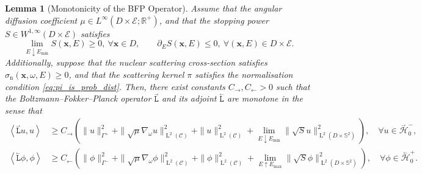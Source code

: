 \documentclass{amsart}
\newcommand{\fL}{\stackrel{_\rightarrow}{\mathtt L}}
\newcommand{\bL}{\stackrel{_\leftarrow}{\mathtt L}}
\theoremstyle{plain}
\newtheorem{lemma}[theorem]{Lemma}
\renewcommand{\vec}[1]{\ensuremath{\boldsymbol{#1}}}
\newcommand{\leb}{\text{Leb}}
\newcommand{\LL}{\ensuremath{\operatorname L}\xspace}
\renewcommand{\leb}[1]{\ensuremath{\LL^{#1}}}
\newcommand{\ltwop}[2]{\ensuremath{\!\left\langle{#1,#2}\right\rangle}}
\newcommand{\cH}{\stackrel{_\rightarrow}{\mathscr H}}
\newcommand{\cbH}{\stackrel{_\leftarrow}{\mathscr H}}
\begin{document}
\begin{lemma}[Monotonicity of the BFP Operator]
  \label{lemma:monotone}
  Assume that the angular diffusion coefficient $\mu \in
  L^{\infty}(D \times \mathcal{E}; \mathbb{R}^+)$, and that the
  stopping power $S \in W^{1,\infty}(D \times \mathcal{E})$
  satisfies
  \begin{equation}
    \lim_{E \downarrow E_{\min}} S(\vec x, E) \geq 0,~ \forall \vec x \in D, 
    \qquad 
    \partial_E S(\vec x, E) \leq 0,~ \forall (\vec x, E) \in D \times \mathcal{E}.
  \end{equation}
  Additionally, suppose that the nuclear scattering cross-section satisfies
  $\sigma_{\mathrm{n}}(\vec{x}, \omega, E) \geq 0$, and that the scattering kernel
  $\pi$ satisfies the normalisation condition \eqref{eq:pi_is_prob_dist}.
  Then, there exist constants $C_{\rightarrow}, C_{\leftarrow} > 0$ such that the
  Boltzmann--Fokker--Planck operator $\fL$ and its adjoint $\bL$ are
  monotone in the sense that
  \begin{equation}
    \begin{aligned}
        \ltwop{\fL u}{u} 
        &\geq
        C_{\rightarrow} \left(\|u\|^2_{\Gamma^+} 
        + \|\sqrt{\mu}\nabla_{\omega}u\|^2_{\leb2(\mathcal{C})} 
        + \|u\|^2_{\leb2(\mathcal{C})} 
        + \lim_{E \downarrow E_{\min}} \|\sqrt{S}u\|^2_{\leb2(D\times \mathbb{S}^2)} \right),
        \quad \forall u \in \cH_0^-, 
    \\ 
        \ltwop{\bL \phi}{\phi} 
        &\geq 
        C_{\leftarrow} \left(\|\phi\|^2_{\Gamma^-} 
        + \|\sqrt{\mu}\nabla_{\omega}\phi\|^2_{\leb2(\mathcal{C})} 
        + \|\phi\|^2_{\leb2(\mathcal{C})} 
        + \lim_{E \uparrow E_{\max}} \|\sqrt{S}\phi\|^2_{\leb2(D\times \mathbb{S}^2)} \right), 
        \quad \forall \phi \in \cbH_0^+.
    \end{aligned}
  \end{equation}
\end{lemma}
\end{document}
